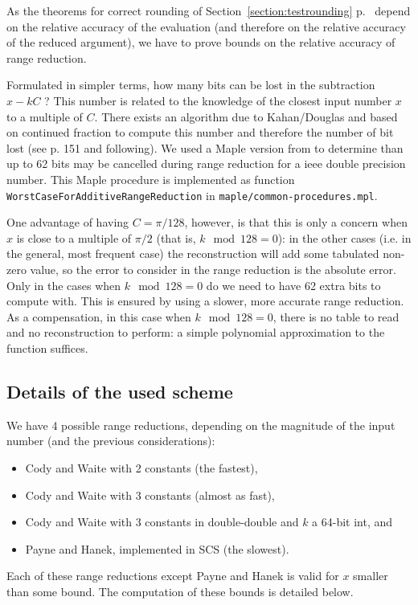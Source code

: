 As the theorems for correct rounding of
Section~\ref{section:testrounding} p.~\pageref{section:testrounding}
depend on the relative accuracy of the evaluation (and therefore on
the relative accuracy of the reduced argument), we have to prove
bounds on the relative accuracy of range reduction.

Formulated in simpler terms, how many bits can be lost in the
subtraction $x-kC$ ? This number is related to the knowledge of the
closest input number $x$ to a multiple of $C$. There exists an
algorithm due to Kahan/Douglas and based on continued fraction to
compute this number and therefore the number of bit lost (see
\cite{Muller97} p. 151 and following).  We used a Maple version from
\cite{Muller97} to determine than up to 62 bits may be cancelled
during range reduction for a ieee double precision number. This Maple
procedure is implemented as function
\texttt{WorstCaseForAdditiveRangeReduction} in
\texttt{maple/common-procedures.mpl}.

One advantage of having $C=\pi/128$, however, is that this is only a
concern when $x$ is close to a multiple of $\pi/2$ (that is, $k \mod
128=0$): in the other cases (i.e. in the general, most frequent case)
the reconstruction will add some tabulated non-zero value, so the
error to consider in the range reduction is the absolute error.  Only
in the cases when $k \mod 128=0$ do we need to have 62 extra bits to
compute with. This is ensured by using a slower, more accurate range
reduction. As a compensation, in this case when $k \mod 128=0$, there
is no table to read and no reconstruction to perform: a simple
polynomial approximation to the function suffices.



\subsection{Details of the used scheme}

We have 4 possible range reductions, depending on the magnitude of the
input number (and the previous considerations):

\begin{itemize}
\item Cody and Waite with 2 constants (the fastest),
\item Cody and Waite with 3 constants (almost as fast),
\item Cody and Waite with 3 constants in double-double and $k$ a
  64-bit int, and 
\item Payne and Hanek, implemented in SCS (the slowest).
\end{itemize}
Each of these range reductions except Payne and Hanek is valid for $x$
smaller than some bound. The computation of these bounds is detailed
below.

